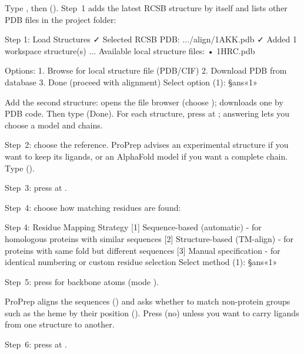 \begin{steps}
  \item Type , then  ().
        Step~1 adds the latest RCSB structure by itself and lists other PDB
        files in the project folder:
\begin{screen}
Step 1: Load Structures
✓ Selected RCSB PDB: .../align/1AKK.pdb
✓ Added 1 workspace structure(s)
...
Available local structure files:
  • 1HRC.pdb

Options:
  1. Browse for local structure file (PDB/CIF)
  2. Download PDB from database
  3. Done (proceed with alignment)
Select option (1): §ans«1»
\end{screen}
  \item Add the second structure:  opens the file browser (choose
        );  downloads one by PDB code. Then type 
        (Done). For each structure, press  at
        ; answering
         lets you choose a model and chains.
  \item Step~2: choose the reference. ProPrep advises an experimental
        structure if you want to keep its ligands, or an AlphaFold model if you
        want a complete chain. Type  ().
  \item Step~3: press  at .
  \item Step~4: choose how matching residues are found:
\begin{screen}
Step 4: Residue Mapping Strategy
  [1] Sequence-based (automatic) - for homologous proteins with similar
      sequences
  [2] Structure-based (TM-align) - for proteins with same fold but different
      sequences
  [3] Manual specification - for identical numbering or custom residue selection
Select method (1): §ans«1»
\end{screen}
  \item Step~5: press  for backbone atoms (mode ).
  \item ProPrep aligns the sequences () and asks whether to match non-protein groups such as the
        heme by their position
        (). Press  (no) unless you want to
        carry ligands from one structure to another.
  \item Step~6: press  at .
\end{steps}

